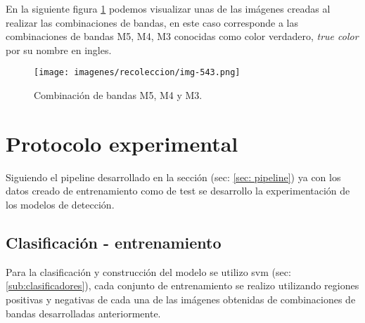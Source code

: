 En la siguiente figura \ref{Fig: bandas543} podemos visualizar unas de las imágenes creadas al realizar las combinaciones de bandas, en este caso corresponde  a las combinaciones de bandas M5, M4, M3 conocidas como color verdadero, \textit{true color} por su nombre en ingles.

\begin{figure}[H]
 \centering
  \texttt{[image: imagenes/recoleccion/img-543.png]}
  \caption{Combinación de bandas M5, M4 y M3.}
	\label{Fig: bandas543}
\end{figure}



\section{Protocolo experimental}\label{sec:entrenamiento}

Siguiendo el pipeline desarrollado en la sección (sec: \ref{sec: pipeline}) ya con los datos creado de entrenamiento como de test se desarrollo la experimentación de los modelos de detección.

\subsection*{Clasificación - entrenamiento}\label{sub:entr_class}

Para la clasificación y construcción del modelo se utilizo \ac{svm} (sec: \ref{sub:clasificadores}), cada conjunto de entrenamiento se realizo utilizando regiones positivas y negativas de cada una de las imágenes obtenidas de combinaciones de bandas desarrolladas anteriormente.

